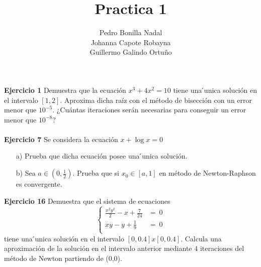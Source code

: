 \documentclass[11pt]{article}
\title{\textbf{Practica 1}}
\author{Pedro Bonilla Nadal\\
		Johanna Capote Robayna\\
		Guillermo Galindo Ortuño}
\date{}
\begin{document}
\maketitle

\textbf{Ejercicio 1}
Demuestra que la ecuaci\'on $x^3 + 4x^2 = 10 $ tiene una  ́unica soluci\'on en el intervalo $ [1,2] $. Aproxima dicha ra\'iz con el m\'etodo de bisecci\'on con un error menor que $10^{-5}$. ¿Cu\'antas iteraciones ser\'an necesarias para conseguir un error menor que $10^{-8}$?
\\
\\
\textbf{Ejercicio 7}
Se considera la ecuaci\'on $x + \log x = 0$ 
\begin{itemize}

\item[a)]Prueba que dicha ecuaci\'on posee una ́unica soluci\'on.
\item[b)] Sea $a \in (0, \frac{1}{2})$. Prueba que  si $x_0 \in [a,1]$ en m\'etodo de Newton-Raphson es convergente.

\end{itemize}
\textbf{Ejercicio 16} 
Demuestra que el sistema de ecuaciones
$$\begin{cases}
\frac{x^2y^2}{2} - x + \frac{7}{24} &= \ 0 \\
xy - y + \frac{1}{9} &= \ 0\\
\end{cases}$$
tiene una  ́unica soluci\'on en el intervalo $[0, 0.4]x[0, 0.4]$. Calcula una aproximaci\'on de la soluci\'on en el intervalo anterior mediante 4 iteraciones del m\'etodo de Newton partiendo de (0,0).
\end{document}
